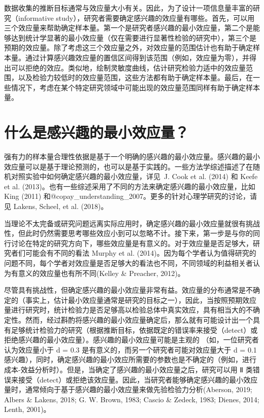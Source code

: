 \documentclass[
  letterpaper,
  DIV=11,
  numbers=noendperiod]{scrreprt}
\begin{document}
数据收集的推断目标通常与效应量大小有关。因此，为了设计一项信息量丰富的研究（informative
study），研究者需要确定感兴趣的效应量有哪些。首先，可以用三个效应量来帮助确定样本量。第一个是研究者感兴趣的最小效应量，第二个是能够达到统计学显著的最小效应量（仅在需要进行显著性检验的研究中），第三个是预期的效应量。除了考虑这三个效应量之外，对效应量的范围估计也有助于确定样本量。通过计算感兴趣效应量的置信区间得到该范围（例如，效应量为零），并得出可以拒绝的效应。类似地，绘制灵敏度曲线，估计研究检验力适中的效应量范围，以及检验力较低时的效应量范围，这些方法都有助于确定样本量。最后，在一些情况下，考虑在某个特定研究领域中可能出现的效应量范围同样有助于确定样本量。

\hypertarget{ux4ec0ux4e48ux662fux611fux5174ux8da3ux7684ux6700ux5c0fux6548ux5e94ux91cf}{%
\section{什么是感兴趣的最小效应量？}\label{ux4ec0ux4e48ux662fux611fux5174ux8da3ux7684ux6700ux5c0fux6548ux5e94ux91cf}}

强有力的样本量合理性依据是基于一个明确的感兴趣的最小效应量。感兴趣的最小效应量可以是基于理论预测的，也可以是基于实践的。一些方法学综述描述了在随机对照实验中如何确定感兴趣的最小效应量，详见~J.
Cook et al. (2014) 和 Keefe et al.
(2013)。也有一些综述采用了不同的方法来确定感兴趣的最小效应量，比如 King
(2011) 和@copay\_understanding\_2007。更多的针对心理学研究的讨论，请见
Lakens, Scheel, et al. (2018)。

当理论不太完备或研究问题远离实际应用时，确定感兴趣的最小效应量就很有挑战性，但此时仍然需要思考哪些效应小到可以忽略不计。接下来，第一步是与你的同行讨论在特定的研究方向下，哪些效应量是有意义的。对于效应量是否足够大，研究者们可能会有不同的看法
Murphy et al.
(2014)。因为每个学者认为值得研究的问题不同，每个学者对效应量是否足够大的看法也不同，不同领域的利益相关者认为有意义的效应量也有所不同(Kelley
\& Preacher, 2012)。

尽管具有挑战性，但确定感兴趣的最小效应量非常有益。效应量的分布通常是不确定的（事实上，估计最小效应量通常是研究的目标之一），因此，当按照预期效应量进行研究时，统计检验力是否足够高以检验总体中真实效应，具有相当大的不确定性。然而，经过斟酌将感兴趣的最小效应量确定后，那么就有可能设计出一个具有足够统计检验力的研究（根据推断目标，依据既定的错误率来接受（detect）或拒绝感兴趣的最小效应量）。感兴趣的最小效应量可能是主观的
（如，一位研究者认为效应量小于 d = 0.3
是有意义的，而另一个研究者可能对效应量大于 d = 0.1
感兴趣），同时，确定感兴趣的最小效应所需要的参数也是不确定的（例如，进行成本-效益分析时）。但是，当确定了感兴趣的最小效应量之后，研究可以用
Ⅱ
类错误来接受（detect）或拒绝该效应量。因此，当研究者能够确定感兴趣的最小效应量时，通常倾向于基于感兴趣的最小效应量来做先验检验力分析(Aberson,
2019; Albers \& Lakens, 2018; G. W. Brown, 1983; Cascio \& Zedeck, 1983;
Dienes, 2014; Lenth, 2001)。
\end{document}
